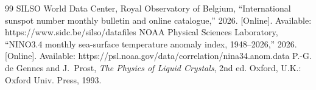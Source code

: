 \documentclass[conference]{IEEEtran}
\begin{document}
\begin{thebibliography}{99}
 SILSO World Data Center, Royal Observatory of Belgium,
``International sunspot number monthly bulletin and online catalogue,'' 2026.
[Online]. Available: https://www.sidc.be/silso/datafiles
 NOAA Physical Sciences Laboratory, ``NINO3.4 monthly sea-surface
temperature anomaly index, 1948--2026,'' 2026. [Online]. Available:
https://psl.noaa.gov/data/correlation/nina34.anom.data
 P.-G. de Gennes and J.~Prost, \emph{The Physics of Liquid Crystals},
2nd ed. Oxford, U.K.: Oxford Univ. Press, 1993.
\end{thebibliography}
\end{document}
